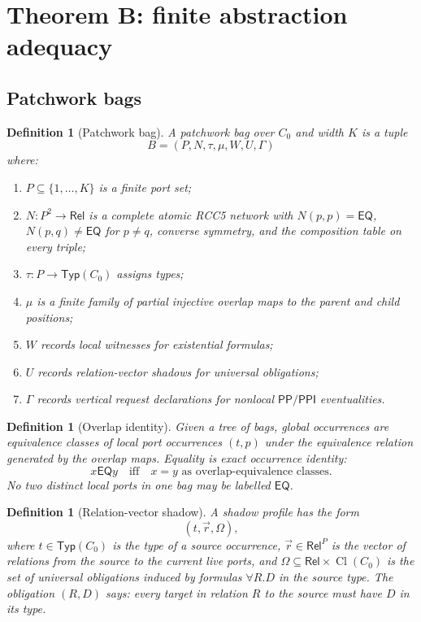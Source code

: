 \documentclass[11pt]{article}
\newtheorem{definition}[theorem]{Definition}
\newcommand{\Rel}{\mathsf{Rel}}
\newcommand{\EQ}{\mathsf{EQ}}
\newcommand{\PP}{\mathsf{PP}}
\newcommand{\PPI}{\mathsf{PPI}}
\newcommand{\Cl}{\operatorname{Cl}}
\newcommand{\Typ}{\mathsf{Typ}}
\begin{document}
\section{Theorem B: finite abstraction adequacy}

\subsection{Patchwork bags}

\begin{definition}[Patchwork bag]\label{def:bag}
A patchwork bag over $C_0$ and width $K$ is a tuple
\[
B=(P,N,\tau,\mu,W,U,\Gamma)
\]
where:
\begin{enumerate}[label=(B\arabic*)]
\item $P\subseteq\{1,\ldots,K\}$ is a finite port set;
\item $N:P^2\to\Rel$ is a complete atomic RCC5 network with $N(p,p)=\EQ$, $N(p,q)\ne\EQ$ for $p\ne q$, converse symmetry, and the composition table on every triple;
\item $\tau:P\to\Typ(C_0)$ assigns types;
\item $\mu$ is a finite family of partial injective overlap maps to the parent and child positions;
\item $W$ records local witnesses for existential formulas;
\item $U$ records relation-vector shadows for universal obligations;
\item $\Gamma$ records vertical request declarations for nonlocal $\PP/\PPI$ eventualities.
\end{enumerate}
\end{definition}

\begin{definition}[Overlap identity]
Given a tree of bags, global occurrences are equivalence classes of local port occurrences $(t,p)$ under the equivalence relation generated by the overlap maps.  Equality is exact occurrence identity:
\[
x\EQ y\quad\text{iff}\quad x=y\text{ as overlap-equivalence classes}.
\]
No two distinct local ports in one bag may be labelled $\EQ$.
\end{definition}

\begin{definition}[Relation-vector shadow]\label{def:shadow}
A shadow profile has the form
\[
(t,\vec r,\Omega),
\]
where $t\in\Typ(C_0)$ is the type of a source occurrence, $\vec r\in\Rel^P$ is the vector of relations from the source to the current live ports, and $\Omega\subseteq\Rel\times\Cl(C_0)$ is the set of universal obligations induced by formulas $\forall R.D$ in the source type.  The obligation $(R,D)$ says: every target in relation $R$ to the source must have $D$ in its type.
\end{definition}
\end{document}
